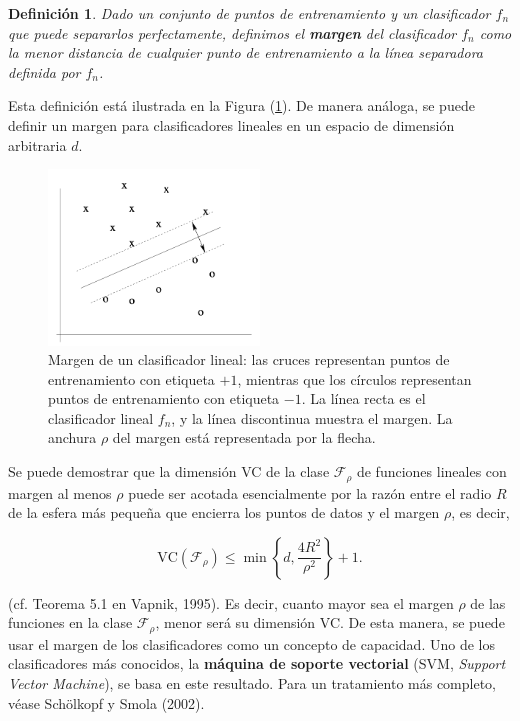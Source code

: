 \documentclass{report}
\newtheorem{dfn}{Definición}[subsection]
\begin{document}
\begin{dfn}
    Dado un conjunto de puntos de entrenamiento y un clasificador \(f_n\) que puede separarlos perfectamente, definimos 
    el \textbf{margen} del clasificador \(f_n\) como la menor distancia de cualquier punto de entrenamiento 
    a la línea separadora definida por \(f_n\).  \label{def:margen} 
\end{dfn}

Esta definición está ilustrada en la Figura (\ref{fig:Clasificación con margen}). 
De manera análoga, se puede definir un margen para clasificadores lineales en un espacio de dimensión arbitraria \(d\).

\begin{figure}[ht!]
    \centering
    \includegraphics[width=0.5\textwidth]{Images/6.png}
    \caption{Margen de un clasificador lineal: las cruces representan puntos de entrenamiento con 
    etiqueta \(+1\), mientras que los círculos representan puntos de entrenamiento con etiqueta \(-1\). 
    La línea recta es el clasificador lineal \(f_n\), y la línea discontinua muestra el margen. La 
    anchura \(\rho\) del margen está representada por la flecha.}
    \label{fig:Clasificación con margen}
\end{figure}

Se puede demostrar que la dimensión VC de la clase \(\mathcal{F}_\rho\) de funciones lineales con 
margen al menos \(\rho\) puede ser acotada esencialmente por la razón entre el radio \(R\) de la 
esfera más pequeña que encierra los puntos de datos y el margen \(\rho\), es decir,

\[
\text{VC}(\mathcal{F}_\rho) \leq \min \left\{d, \frac{4R^2}{\rho^2} \right\} +1.
\]

(cf. Teorema 5.1 en Vapnik, 1995). Es decir, cuanto mayor sea el margen \(\rho\) de las funciones 
en la clase \(\mathcal{F}_\rho\), menor será su dimensión VC. De esta manera, se puede usar el 
margen de los clasificadores como un concepto de capacidad. Uno de los clasificadores más conocidos, 
la \textbf{máquina de soporte vectorial} (SVM, \textit{Support Vector Machine}), se basa en este 
resultado. Para un tratamiento más completo, véase Schölkopf y Smola (2002).\newline
\end{document}
